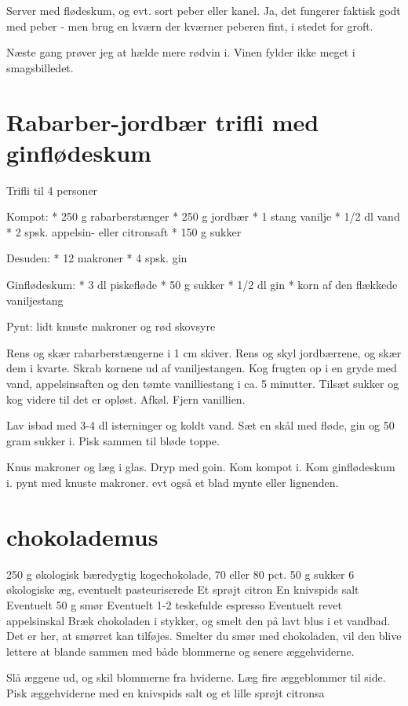 \documentclass[
]{book}
\begin{document}
Server med flødeskum, og evt. sort peber eller kanel. Ja, det fungerer faktisk godt med peber - men brug en kværn der kværner peberen fint, i stedet for groft.

Næste gang prøver jeg at hælde mere rødvin i. Vinen fylder ikke meget i smagsbilledet.

\section{Rabarber-jordbær trifli med ginflødeskum}\label{rabarber-jordbuxe6r-trifli-med-ginfluxf8deskum}

Trifli til 4 personer

Kompot:
* 250 g rabarberstænger
* 250 g jordbær
* 1 stang vanilje
* 1/2 dl vand
* 2 spsk. appelsin- eller citronsaft
* 150 g sukker

Desuden:
* 12 makroner
* 4 spsk. gin

Ginflødeskum:
* 3 dl piskefløde
* 50 g sukker
* 1/2 dl gin
* korn af den flækkede vaniljestang

Pynt:
lidt knuste makroner og rød skovsyre

Rens og skær rabarberstængerne i 1 cm skiver. Rens og skyl jordbærrene, og skær
dem i kvarte. Skrab kornene ud af vaniljestangen.
Kog frugten op i en gryde med vand, appelsinsaften og den tømte vanilliestang
i ca. 5 minutter.
Tilsæt sukker og kog videre til det er opløst. Afkøl. Fjern vanillien.

Lav isbad med 3-4 dl isterninger og koldt vand. Sæt en skål med fløde,
gin og 50 gram sukker i. Pisk sammen til bløde toppe.

Knus makroner og læg i glas. Dryp med goin. Kom kompot i. Kom ginflødeskum i.
pynt med knuste makroner. evt også et blad mynte eller lignenden.

\section{chokolademus}\label{chokolademus}

250 g økologisk bæredygtig kogechokolade, 70 eller 80 pct.
50 g sukker 6 økologiske æg, eventuelt pasteuriserede Et sprøjt citron En knivspids salt
Eventuelt 50 g smør Eventuelt 1-2 teskefulde espresso Eventuelt revet appelsinskal Bræk
chokoladen i stykker, og smelt den på lavt blus i et vandbad.
Det er her, at smørret kan tilføjes. Smelter du smør med chokoladen, vil den blive lettere
at blande sammen med både blommerne og senere æggehviderne.

Slå æggene ud, og skil blommerne fra hviderne.
Læg fire æggeblommer til side.
Pisk æggehviderne med en knivspids salt og et lille sprøjt citronsa
\end{document}
